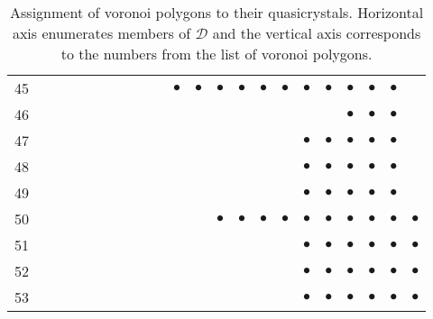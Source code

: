 \documentclass[text.tex]{subfiles}
\begin{document}
\begin{table}
\begin{tabular}{l|ccccccccccccccccccccc}
45  &           &           &           &           &           &           &           &           &           & $\bullet$ & $\bullet$ & $\bullet$ & $\bullet$ & $\bullet$ & $\bullet$ & $\bullet$ & $\bullet$ & $\bullet$ & $\bullet$ & $\bullet$ &           \\
46  &           &           &           &           &           &           &           &           &           &           &           &           &           &           &           &           &           & $\bullet$ & $\bullet$ & $\bullet$ &           \\ 
47  &           &           &           &           &           &           &           &           &           &           &           &           &           &           &           & $\bullet$ & $\bullet$ & $\bullet$ & $\bullet$ & $\bullet$ &           \\
48  &           &           &           &           &           &           &           &           &           &           &           &           &           &           &           & $\bullet$ & $\bullet$ & $\bullet$ & $\bullet$ & $\bullet$ &           \\ 
49  &           &           &           &           &           &           &           &           &           &           &           &           &           &           &           & $\bullet$ & $\bullet$ & $\bullet$ & $\bullet$ & $\bullet$ &           \\
50  &           &           &           &           &           &           &           &           &           &           &           & $\bullet$ & $\bullet$ & $\bullet$ & $\bullet$ & $\bullet$ & $\bullet$ & $\bullet$ & $\bullet$ & $\bullet$ & $\bullet$ \\ 
51  &           &           &           &           &           &           &           &           &           &           &           &           &           &           &           & $\bullet$ & $\bullet$ & $\bullet$ & $\bullet$ & $\bullet$ & $\bullet$ \\
52  &           &           &           &           &           &           &           &           &           &           &           &           &           &           &           & $\bullet$ & $\bullet$ & $\bullet$ & $\bullet$ & $\bullet$ & $\bullet$ \\
53  &           &           &           &           &           &           &           &           &           &           &           &           &           &           &           & $\bullet$ & $\bullet$ & $\bullet$ & $\bullet$ & $\bullet$ & $\bullet$ \\
\bottomrule
\end{tabular}
\caption{Assignment of voronoi polygons to their quasicrystals. Horizontal axis enumerates members of $\mathcal{D}$ and the vertical axis corresponds to the numbers from the list of voronoi polygons.}
\label{table:tiles1}
\end{table}

\restoregeometry
\end{document}
